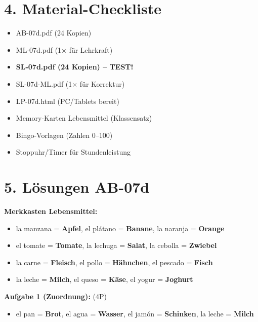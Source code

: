 \documentclass[11pt, a4paper]{article}
\newcommand{\sequenz}{07}
\newcommand{\block}{d}
\newcommand{\lerngruppengroesse}{24}
\newcommand{\loesung}[1]{\textcolor{loesung}{\textbf{#1}}}
\begin{document}
\section*{4. Material-Checkliste}

\begin{materialbox}
\begin{itemize}[label=$\square$]
    \item AB-\sequenz\block.pdf (\lerngruppengroesse{} Kopien)
    \item ML-\sequenz\block.pdf (1× für Lehrkraft)
    \item \textbf{SL-\sequenz\block.pdf (\lerngruppengroesse{} Kopien) -- TEST!}
    \item SL-\sequenz\block-ML.pdf (1× für Korrektur)
    \item LP-\sequenz\block.html (PC/Tablets bereit)
    \item Memory-Karten Lebensmittel (Klassensatz)
    \item Bingo-Vorlagen (Zahlen 0--100)
    \item Stoppuhr/Timer für Stundenleistung
\end{itemize}
\end{materialbox}

\section*{5. Lösungen AB-\sequenz\block}

\textbf{Merkkasten Lebensmittel:}
\begin{itemize}
    \item la manzana = \loesung{Apfel}, el plátano = \loesung{Banane}, la naranja = \loesung{Orange}
    \item el tomate = \loesung{Tomate}, la lechuga = \loesung{Salat}, la cebolla = \loesung{Zwiebel}
    \item la carne = \loesung{Fleisch}, el pollo = \loesung{Hähnchen}, el pescado = \loesung{Fisch}
    \item la leche = \loesung{Milch}, el queso = \loesung{Käse}, el yogur = \loesung{Joghurt}
\end{itemize}

\textbf{Aufgabe 1 (Zuordnung):} (4P)
\begin{itemize}
    \item el pan = \loesung{Brot}, el agua = \loesung{Wasser}, el jamón = \loesung{Schinken}, la leche = \loesung{Milch}
\end{itemize}
\end{document}
